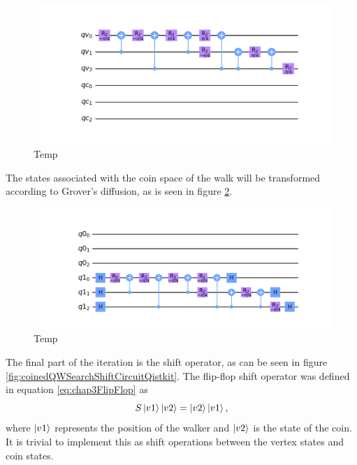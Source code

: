 \documentclass[../../dissertation.tex]{subfiles}
\begin{document}
\begin{figure}[!h]
	\centering
	\includegraphics[scale=0.30]{img/Qiskit/CoinedQuantumWalk/Search/Circuits/CoinedSearchQiskitCircOracle_N3_M4_S5.png}
	\caption{Temp} 
	\label{fig:coinedQWSearchOracleCircuitQistkit}
\end{figure}\par
The states associated with the coin space of the walk will be transformed according to Grover's diffusion, as is seen in figure \ref{fig:coinedQWSearchDiffCircuitQistkit}.
\begin{figure}[!h]
	\centering
	\includegraphics[scale=0.30]{img/Qiskit/CoinedQuantumWalk/Search/Circuits/CoinedSearchQiskitCircDiff_N3_M4_S5.png}
	\caption{Temp} 
	\label{fig:coinedQWSearchDiffCircuitQistkit}
\end{figure}\par
The final part of the iteration is the shift operator, as can be seen in figure \ref{fig:coinedQWSearchShiftCircuitQistkit}. The flip-flop shift operator was defined in equation \ref{eq:chap3FlipFlop} as 
\begin{equation}
        S\ket{v1}\ket{v2} = \ket{v2}\ket{v1},
        \label{eq:chap4FlipFlop}
\end{equation}
where $\ket{v1}$ represents the position of the walker and $\ket{v2}$ is the state of the coin. It is trivial to implement this as shift operations between the vertex states and coin states.
\end{document}

